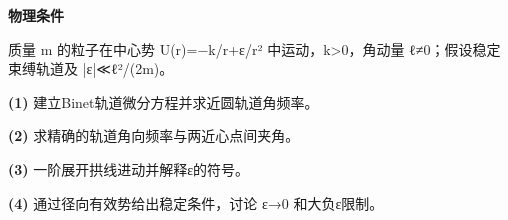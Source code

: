 \textbf{物理条件}\par 质量 m 的粒子在中心势 U(r)=−k/r+ε/r² 中运动，k>0，角动量 ℓ≠0；假设稳定束缚轨道及 |ε|≪ℓ²/(2m)。
\par\noindent\textbf{(1)} 建立Binet轨道微分方程并求近圆轨道角频率。
\par\noindent\textbf{(2)} 求精确的轨道角向频率与两近心点间夹角。
\par\noindent\textbf{(3)} 一阶展开拱线进动并解释ε的符号。
\par\noindent\textbf{(4)} 通过径向有效势给出稳定条件，讨论 ε→0 和大负ε限制。
